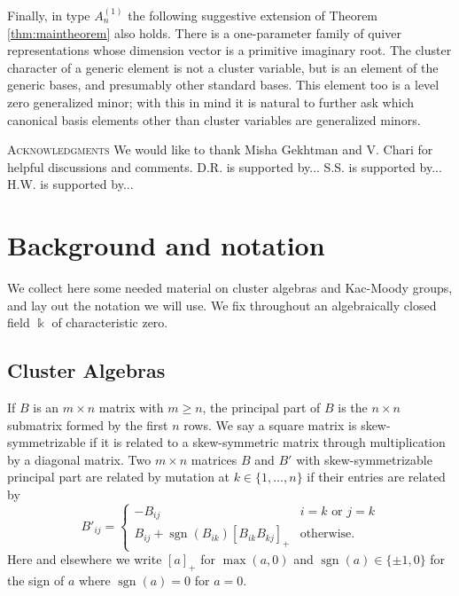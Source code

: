 \documentclass[12pt]{amsart}
\newcommand{\sayHW}[1]{\say[HW]{\color{violet}{\bf HW:}\;#1}}
\newcommand{\sayDR}[1]{\say[DR]{\color{red}{\bf DR:}\;#1}}
\newcommand{\kk}{\Bbbk}%
\newcommand{\sgn}{\operatorname{sgn}}
\theoremstyle{remark}
\numberwithin{equation}{section}
\begin{document}
Finally, in type $A_n^{(1)}$ the following suggestive extension of Theorem \ref{thm:maintheorem} also holds. There is a one-parameter family of quiver representations whose dimension vector is a primitive imaginary root. The cluster character of a generic element is not a cluster variable, but is an element of the generic bases, and presumably other standard bases. This element too is a level zero generalized minor; with this in mind it is natural to further ask which canonical basis elements other than cluster variables are generalized minors.

\textsc{Acknowledgments}  We would like to thank Misha Gekhtman and V. Chari for helpful discussions and comments. D.R. is supported by... S.S. is supported by... H.W. is supported by...

\section{Background and notation}

We collect here some needed material on cluster algebras and Kac-Moody groups, and lay out the notation we will use.  
We fix throughout an algebraically closed field $\kk$ of characteristic zero. 

\subsection{Cluster Algebras}

If $B$ is an $m \times n$ matrix with $m \geq n$, the principal part of $B$ is the $n \times n$ submatrix formed by the first $n$ rows. 
We say a square matrix is skew-symmetrizable if it is related to a skew-symmetric matrix through multiplication by a diagonal matrix. 
Two $m \times n$ matrices $B$ and $B'$ with skew-symmetrizable principal part are related by mutation at $k \in \{1,\dotsc,n\}$ if their entries are related by  
\[
B'_{ij} = \begin{cases}
-B_{ij} & i = k \text{ or } j = k\\
B_{ij} + \sgn(B_{ik})[B_{ik}B_{kj}]_+ & \text{otherwise.}
\end{cases}
\]
Here and elsewhere we write $[a]_+$ for $\max(a,0)$ and $\sgn(a) \in \{\pm 1,0\}$ for the sign of $a$ where $\sgn(a)=0$ for $a=0$. %
\end{document}
